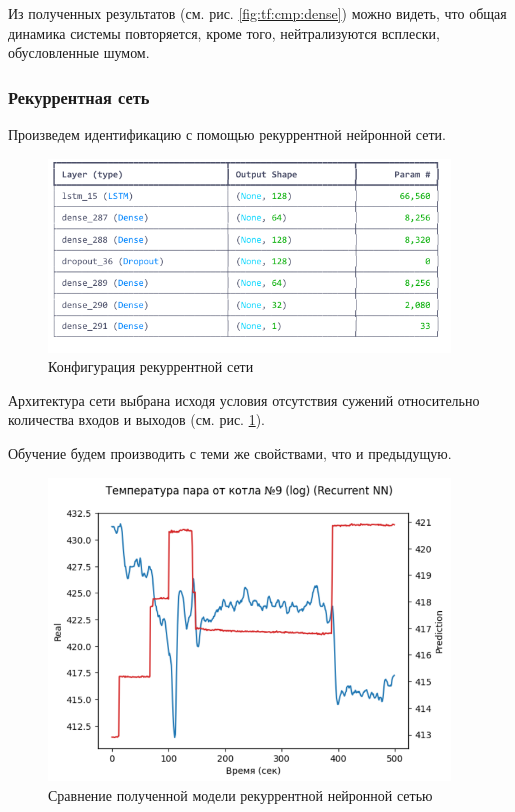 Из полученных результатов (см. рис. \ref{fig:tf:cmp:dense}) можно видеть, что
общая динамика системы повторяется, кроме того, нейтрализуются всплески,
обусловленные шумом. 

\subsubsection{Рекуррентная сеть}

Произведем идентификацию с помощью рекуррентной
нейронной сети. 

\begin{figure}[H]
  \begin{center}
    \includegraphics[width=0.95\textwidth]{figures/tensorflow/rnn.png}
  \end{center}
  \caption{Конфигурация рекуррентной сети}\label{fig:tf:rnn}
\end{figure}

Архитектура сети выбрана исходя условия отсутствия
сужений относительно количества входов и выходов (см.
рис. \ref{fig:tf:rnn}). 

Обучение будем производить с теми же свойствами, что и предыдущую. 

\begin{figure}[H]
  \begin{center}
    \includegraphics[width=0.95\textwidth]{figures/tensorflow/rnn_compare.png}
  \end{center}
  \caption{Сравнение полученной модели рекуррентной нейронной
  сетью}\label{fig:tf:cmp:rnn}
\end{figure}

